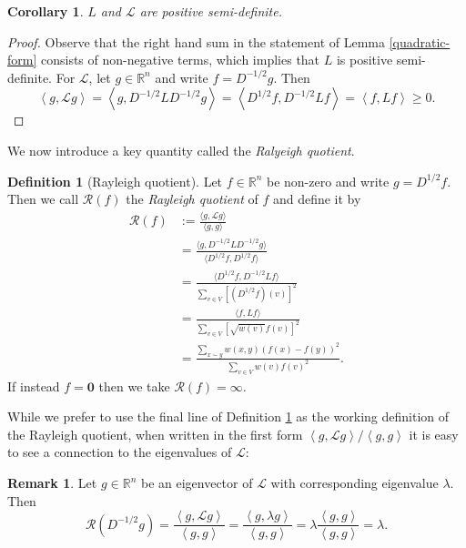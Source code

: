 \documentclass[a4paper,11pt]{article}
\newtheorem{corollary}[theorem]{Corollary}
\theoremstyle{definition}
\newtheorem{definition}[theorem]{Definition}
\newtheorem{remark}[theorem]{Remark}
\newcommand{\R}{\mathbb{R}}
\renewcommand{\L}{\mathcal{L}}
\newcommand{\rayleigh}[1]{\mathcal{R}\left(#1\right)}
\newcommand{\inner}[2]{\left\langle #1, #2 \right\rangle}
\begin{document}
\begin{corollary}\label{positive-semi-definite}
$L$ and $\L$ are positive semi-definite.
\end{corollary}
\begin{proof}
Observe that the right hand sum in the statement of Lemma \ref{quadratic-form} consists of non-negative terms, which implies that $L$ is positive semi-definite. For $\L$, let $g \in \R^n$ and write $f = D^{-1/2}g$. Then \[\inner{g}{\L g} = \inner{g}{D^{-1/2}LD^{-1/2}g} = \inner{D^{1/2}f}{D^{-1/2}Lf} = \inner{f}{Lf} \ge 0.\]
\end{proof}

We now introduce a key quantity called the \emph{Ralyeigh quotient}.

\begin{definition}[Rayleigh quotient]\label{rayleigh}
Let $f \in \R^n$ be non-zero and write $g = D^{1/2}f$. Then we call $\rayleigh{f}$ the \emph{Rayleigh quotient} of $f$ and define it by
\begin{align*}
\rayleigh{f} &:= \frac{\langle g, \L g \rangle}{\langle g, g \rangle} \\
&= \frac{\langle g, D^{-1/2}LD^{-1/2}g \rangle}{\langle D^{1/2}f, D^{1/2}f \rangle} \\
&= \frac{\langle D^{1/2} f, D^{-1/2}Lf \rangle}{\displaystyle\sum_{v \in V}\left[(D^{1/2}f)(v)\right]^2} \\
&= \frac{\langle f, Lf \rangle}{\displaystyle\sum_{v \in V}\left[\sqrt{w(v)}f(v)\right]^2} \\
&= \frac{\displaystyle\sum_{x \sim y} w(x, y)(f(x) - f(y))^2}{\displaystyle\sum_{v \in V} w(v)f(v)^2}.
\end{align*}
If instead $f = \bm{0}$ then we take $\rayleigh{f} = \infty$.
\end{definition}

While we prefer to use the final line of Definition \ref{rayleigh} as the working definition of the Rayleigh quotient, when written in the first form $\inner{g}{\L g}/\inner{g}{g}$ it is easy to see a connection to the eigenvalues of $\L$:

\begin{remark}\label{rayleigh-eigenvector}
Let $g \in \R^n$ be an eigenvector of $\L$ with corresponding eigenvalue $\lambda$. Then
\[
\rayleigh{D^{-1/2}g} = \frac{\inner{g}{\L g}}{\inner{g}{g}} = \frac{\inner{g}{\lambda g}}{\inner{g}{g}} = \lambda \frac{\inner{g}{g}}{\inner{g}{g}} = \lambda.
\]
\end{remark}
\end{document}
